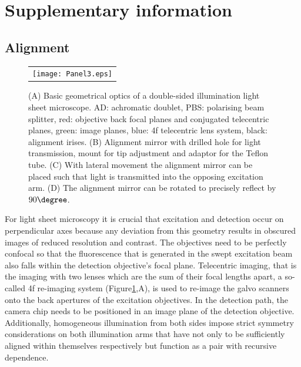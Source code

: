 \documentclass[12pt]{spieman}  %
\begin{document}
\listoftables

\section{Supplementary information}

\subsection{Alignment}

\begin{figure}
   \begin{center}
   \begin{tabular}{c}
   \texttt{[image: Panel3.eps]}
   \end{tabular}
   \end{center}
   \caption{\label{fig:alignment} (A) Basic geometrical optics of a double-sided illumination light sheet microscope. AD: achromatic doublet, PBS: polarising beam splitter, red: objective back focal planes and conjugated telecentric planes, green: image planes, blue: 4f telecentric lens system, black: alignment irises. (B) Alignment mirror with drilled hole for light transmission, mount for tip adjustment and adaptor for the Teflon tube. (C) With lateral movement the alignment mirror can be placed such that light is transmitted into the opposing excitation arm. (D) The alignment mirror can be rotated to precisely reflect by $90\degree$.} 
   \end{figure}

For light sheet microscopy it is crucial that excitation and detection occur on perpendicular axes because any deviation from this geometry results in obscured images of reduced resolution and contrast. The objectives need to be perfectly confocal so that the fluorescence that is generated in the swept excitation beam also falls within the detection objective's focal plane. Telecentric imaging, that is the imaging with two lenses which are the sum of their focal lengths apart, a so-called 4f re-imaging system (Figure\ref{fig:alignment},A), is used to re-image the galvo scanners onto the back apertures of the excitation objectives. In the detection path, the camera chip needs to be positioned in an image plane of the detection objective. Additionally, homogeneous illumination from both sides impose strict symmetry considerations on both illumination arms that have not only to be sufficiently aligned within themselves respectively but function as a pair with recursive dependence. 
\end{document}

